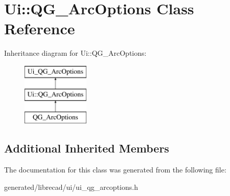 \hypertarget{classUi_1_1QG__ArcOptions}{\section{Ui\-:\-:Q\-G\-\_\-\-Arc\-Options Class Reference}
\label{classUi_1_1QG__ArcOptions}
}
Inheritance diagram for Ui\-:\-:Q\-G\-\_\-\-Arc\-Options\-:\begin{figure}[H]
\begin{center}
\leavevmode
\includegraphics[height=3.000000cm]{classUi_1_1QG__ArcOptions}
\end{center}
\end{figure}
\subsection*{Additional Inherited Members}


The documentation for this class was generated from the following file\-:\begin{DoxyCompactItemize}
\item 
generated/librecad/ui/ui\-\_\-qg\-\_\-arcoptions.\-h\end{DoxyCompactItemize}
